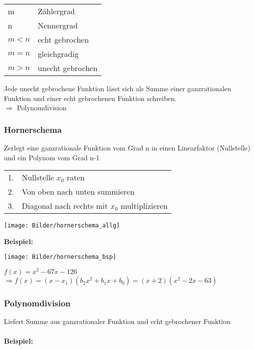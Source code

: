     \begin{tabular}{ll} 
        m & Zählergrad \\
        n & Nennergrad \\
        $m < n$ & echt gebrochen \\
        $m = n$ & gleichgradig \\
        $m > n$ & unecht gebrochen \\ 
    \end{tabular}	

    Jede unecht gebrochene Funktion lässt sich als Summe einer ganzrationalen Funktion und einer echt gebrochenen Funktion schreiben. \\
    $\Rightarrow$ Polynomdivision \\

\subsubsection{Hornerschema}
    Zerlegt eine ganzrationale Funktion vom Grad n in einen Linearfaktor (Nullstelle) und ein Polynom vom Grad n-1 \\
    
    \begin{tabular}{ll}
        1. & Nullstelle $x_0$ raten \\
        2. & Von oben nach unten summieren \\
        3. & Diagonal nach rechts mit $x_0$ multiplizieren \\
    \end{tabular}	
    
    \texttt{[image: Bilder/hornerschema\_allg]}
            
    \textbf{Beispiel:}
    
    \texttt{[image: Bilder/hornerschema\_bsp]}

        $f(x) = x^3-67x-126$\\
        $\Rightarrow f(x) = (x-x_1)(b_2x^2 + b_1x + b_0) = (x+2)(x^2-2x-63)$ 
    
\subsubsection{Polynomdivision}
    Liefert Summe aus ganzrationaler Funktion und echt gebrochener Funktion\\
    \\
    \textbf{Beispiel:}\\
        \vspace{-5pt}  \\
    
